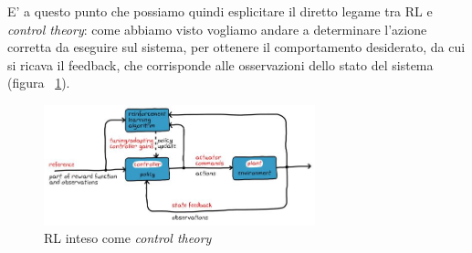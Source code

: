 E' a questo punto che possiamo quindi esplicitare il diretto legame tra RL e \textit{control theory}: come abbiamo visto vogliamo andare a determinare l'azione corretta da eseguire sul sistema, per ottenere il comportamento desiderato, da cui si ricava il feedback, che corrisponde alle osservazioni dello stato del sistema (figura ~\ref{fig:RL_Control}).

\begin{figure}[!h]
	\centering
	\includegraphics[width=0.7\textwidth]{Immagini/RL_Control.JPG}
	\caption{RL inteso come \textit{control theory}}
	\label{fig:RL_Control}
\end{figure}
